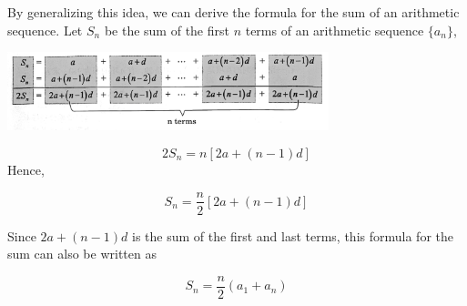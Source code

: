 \documentclass{report}
\begin{document}
\vspace{-1em}
By generalizing this idea, we can derive the formula for the sum of an arithmetic sequence. Let \(S_{n}\) be the sum of the first \(n\) terms of an arithmetic sequence \(\{a_{n}\}\),
\begin{center}
    \includegraphics[width=0.7\textwidth]{assets/13-3.png}
\end{center}
\vspace{-2em}
$$
2 S_{n}=n[2 a+(n-1) d]
$$
Hence,
\begin{info}
    $$S_{n}=\dfrac{n}{2}\left[2 a+(n-1) d\right]$$
\end{info}
Since \(2a + (n-1)d\) is the sum of the first and last terms, this formula for the sum can also be written as
\begin{info}
    $$S_{n}=\dfrac{n}{2}(a_{1}+a_{n})$$
\end{info}
\end{document}
